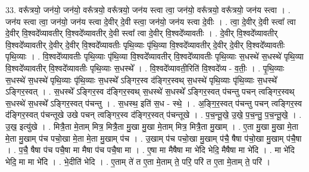 \documentclass[17pt]{extarticle}
\begin{document}
33. वरू᳚त्रयो॒ जन॑यो॒ जन॑यो॒ वरू᳚त्रयो॒ वरू᳚त्रयो॒ जन॑य स्त्वा त्वा॒ जन॑यो॒ वरू᳚त्रयो॒ वरू᳚त्रयो॒ जन॑य स्त्वा । . जन॑य स्त्वा त्वा॒ जन॑यो॒ जन॑य स्त्वा दे॒वीर् दे॒वी स्त्वा॒ जन॑यो॒ जन॑य स्त्वा दे॒वीः । . त्वा॒ दे॒वीर् दे॒वी स्त्वा᳚ त्वा दे॒वीर् वि॒श्वदे᳚व्यावतीर् वि॒श्वदे᳚व्यावतीर् दे॒वी स्त्वा᳚ त्वा दे॒वीर् वि॒श्वदे᳚व्यावतीः । . दे॒वीर् वि॒श्वदे᳚व्यावतीर् वि॒श्वदे᳚व्यावतीर् दे॒वीर् दे॒वीर् वि॒श्वदे᳚व्यावतीः पृथि॒व्याः पृ॑थि॒व्या वि॒श्वदे᳚व्यावतीर् दे॒वीर् दे॒वीर् वि॒श्वदे᳚व्यावतीः पृथि॒व्याः । . वि॒श्वदे᳚व्यावतीः पृथि॒व्याः पृ॑थि॒व्या वि॒श्वदे᳚व्यावतीर् वि॒श्वदे᳚व्यावतीः पृथि॒व्याः स॒धस्थे॑ स॒धस्थे॑ पृथि॒व्या वि॒श्वदे᳚व्यावतीर् वि॒श्वदे᳚व्यावतीः पृथि॒व्याः स॒धस्थे᳚ । . वि॒श्वदे᳚व्यावती॒रिति॑ वि॒श्वदे᳚व्य - व॒तीः॒ । . पृ॒थि॒व्याः स॒धस्थे॑ स॒धस्थे॑ पृथि॒व्याः पृ॑थि॒व्याः स॒धस्थे᳚ ऽङ्गिर॒स्व द॑ङ्गिर॒स्वथ् स॒धस्थे॑ पृथि॒व्याः पृ॑थि॒व्याः स॒धस्थे᳚ ऽङ्गिर॒स्वत् । . स॒धस्थे᳚ ऽङ्गिर॒स्व द॑ङ्गिर॒स्वथ् स॒धस्थे॑ स॒धस्थे᳚ ऽङ्गिर॒स्वत् प॑चन्तु पचन् त्वङ्गिर॒स्वथ् स॒धस्थे॑ स॒धस्थे᳚ ऽङ्गिर॒स्वत् प॑चन्तु । . स॒धस्थ॒ इति॑ स॒ध - स्थे॒ । . अ॒ङ्गि॒र॒स्वत् प॑चन्तु पचन् त्वङ्गिर॒स्व द॑ङ्गिर॒स्वत् प॑चन्तूखे उखे पचन् त्वङ्गिर॒स्व द॑ङ्गिर॒स्वत् प॑चन्तूखे । . प॒च॒न्तू॒खे॒ उ॒खे॒ प॒च॒न्तु॒ प॒च॒न्तू॒खे॒ । . उ॒ख॒ इत्यु॑खे । . मित्रै॒ता मे॒ताम् मित्र॒ मित्रै॒ता मु॒खा मु॒खा मे॒ताम् मित्र॒ मित्रै॒ता मु॒खाम् । . ए॒ता मु॒खा मु॒खा मे॒ता मे॒ता मु॒खाम् प॑च पचो॒खा मे॒ता मे॒ता मु॒खाम् प॑च । . उ॒खाम् प॑च पचो॒खा मु॒खाम् प॑चै॒ षैषा प॑चो॒खा मु॒खाम् प॑चै॒षा । . प॒चै॒ षैषा प॑च पचै॒षा मा मैषा प॑च पचै॒षा मा । . ए॒षा मा मैषैषा मा भे॑दि भेदि॒ मैषैषा मा भे॑दि । . मा भे॑दि भेदि॒ मा मा भे॑दि । . भे॒दीति॑ भेदि । . ए॒ताम् ते॑ त ए॒ता मे॒ताम् ते॒ परि॒ परि॑ त ए॒ता मे॒ताम् ते॒ परि॑ । \newline
\end{document}
